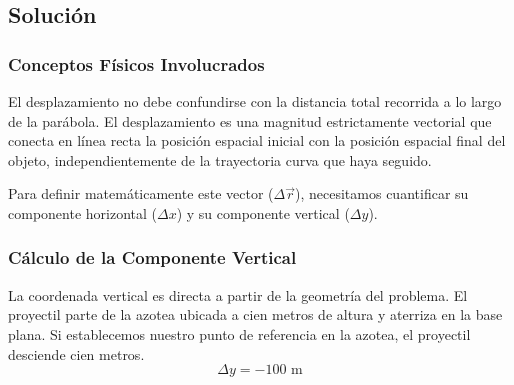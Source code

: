 \documentclass[12pt, a4paper]{article}
\begin{document}
\vspace{0.5cm}

\begin{center}
\end{center}

\subsection*{Solución}

\subsubsection*{Conceptos Físicos Involucrados}

El desplazamiento no debe confundirse con la distancia total recorrida a lo largo de la parábola. El desplazamiento es una magnitud estrictamente vectorial que conecta en línea recta la posición espacial inicial con la posición espacial final del objeto, independientemente de la trayectoria curva que haya seguido.

Para definir matemáticamente este vector ($\Delta\vec{r}$), necesitamos cuantificar su componente horizontal ($\Delta x$) y su componente vertical ($\Delta y$).

\subsubsection*{Cálculo de la Componente Vertical}

La coordenada vertical es directa a partir de la geometría del problema. El proyectil parte de la azotea ubicada a cien metros de altura y aterriza en la base plana. Si establecemos nuestro punto de referencia en la azotea, el proyectil desciende cien metros.
\begin{equation}
\Delta y = -100 \text{ m}
\end{equation}
\end{document}
